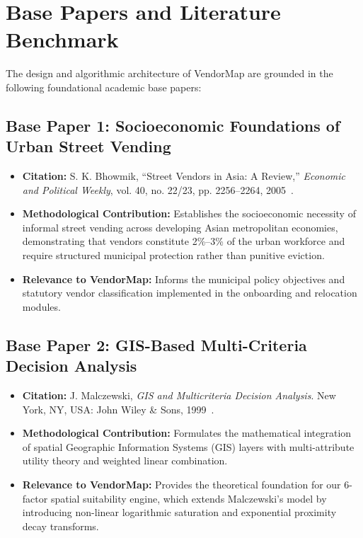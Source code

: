 \clearpage

\chapter{Base Papers and Literature Benchmark}
\label{app:base_papers}

The design and algorithmic architecture of VendorMap are grounded in the following foundational academic base papers:

\section*{Base Paper 1: Socioeconomic Foundations of Urban Street Vending}
\begin{itemize}
    \item \textbf{Citation:} S. K. Bhowmik, ``Street Vendors in Asia: A Review,'' \textit{Economic and Political Weekly}, vol. 40, no. 22/23, pp. 2256--2264, 2005~\cite{bhowmik2005street}.
    \item \textbf{Methodological Contribution:} Establishes the socioeconomic necessity of informal street vending across developing Asian metropolitan economies, demonstrating that vendors constitute 2\%--3\% of the urban workforce and require structured municipal protection rather than punitive eviction.
    \item \textbf{Relevance to VendorMap:} Informs the municipal policy objectives and statutory vendor classification implemented in the onboarding and relocation modules.
\end{itemize}

\section*{Base Paper 2: GIS-Based Multi-Criteria Decision Analysis}
\begin{itemize}
    \item \textbf{Citation:} J. Malczewski, \textit{GIS and Multicriteria Decision Analysis}. New York, NY, USA: John Wiley \& Sons, 1999~\cite{malczewski1999gis}.
    \item \textbf{Methodological Contribution:} Formulates the mathematical integration of spatial Geographic Information Systems (GIS) layers with multi-attribute utility theory and weighted linear combination.
    \item \textbf{Relevance to VendorMap:} Provides the theoretical foundation for our 6-factor spatial suitability engine, which extends Malczewski's model by introducing non-linear logarithmic saturation and exponential proximity decay transforms.
\end{itemize}

